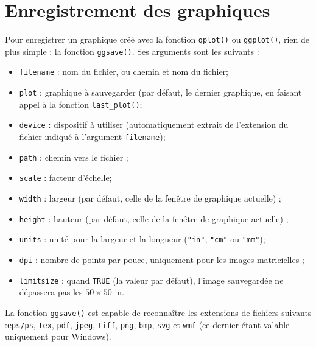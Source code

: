 \documentclass[
  11pt,
]{book}
\providecommand{\tightlist}{%
  \setlength{\itemsep}{0pt}\setlength{\parskip}{0pt}}
\numberwithin{equation}{section}
\numberwithin{countremarque}{section}
\begin{document}
\hypertarget{graphiques_enregistrement}{%
\section{Enregistrement des graphiques}\label{graphiques_enregistrement}}

Pour enregistrer un graphique créé avec la fonction \texttt{qplot()} ou \texttt{ggplot()}, rien de plus simple : la fonction \texttt{ggsave()}. Ses arguments sont les suivants :

\begin{itemize}
\tightlist
\item
  \texttt{filename} : nom du fichier, ou chemin et nom du fichier;
\item
  \texttt{plot} : graphique à sauvegarder (par défaut, le dernier graphique, en faisant appel à la fonction \texttt{last\_plot()};
\item
  \texttt{device} : dispositif à utiliser (automatiquement extrait de l'extension du fichier indiqué à l'argument \texttt{filename});
\item
  \texttt{path} : chemin vers le fichier ;
\item
  \texttt{scale} : facteur d'échelle;
\item
  \texttt{width} : largeur (par défaut, celle de la fenêtre de graphique actuelle) ;
\item
  \texttt{height} : hauteur (par défaut, celle de la fenêtre de graphique actuelle) ;
\item
  \texttt{units} : unité pour la largeur et la longueur (\texttt{"in"}, \texttt{"cm"} ou \texttt{"mm"});
\item
  \texttt{dpi} : nombre de points par pouce, uniquement pour les images matricielles ;
\item
  \texttt{limitsize} : quand \texttt{TRUE} (la valeur par défaut), l'image sauvegardée ne dépassera pas les \(50\times 50\) in.
\end{itemize}

La fonction \texttt{ggsave()} est capable de reconnaître les extensions de fichiers suivants :\texttt{eps/ps}, \texttt{tex}, \texttt{pdf}, \texttt{jpeg}, \texttt{tiff}, \texttt{png}, \texttt{bmp}, \texttt{svg} et \texttt{wmf} (ce dernier étant valable uniquement pour Windows).
\end{document}
